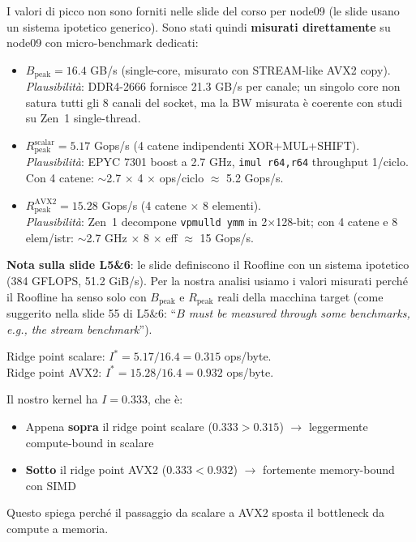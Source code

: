 \documentclass[11pt,a4paper]{article}
\begin{document}
\begin{resultbox}[title=\textbf{Parametri hardware misurati su node09 (micro-benchmark)}]
I valori di picco non sono forniti nelle slide del corso per node09 (le slide usano un sistema ipotetico generico). Sono stati quindi \textbf{misurati direttamente} su node09 con micro-benchmark dedicati:

\begin{itemize}
    \item $B_\text{peak} = 16.4$ GB/s (single-core, misurato con STREAM-like AVX2 copy).\\
    \textit{Plausibilità}: DDR4-2666 fornisce 21.3 GB/s per canale; un singolo core non satura tutti gli 8 canali del socket, ma la BW misurata è coerente con studi su Zen~1 single-thread.
    \item $R_\text{peak}^\text{scalar} = 5.17$ Gops/s (4 catene indipendenti XOR+MUL+SHIFT).\\
    \textit{Plausibilità}: EPYC 7301 boost a 2.7 GHz, \texttt{imul r64,r64} throughput 1/ciclo. Con 4 catene: $\sim$2.7 $\times$ 4 $\times$ ops/ciclo $\approx$ 5.2 Gops/s.
    \item $R_\text{peak}^\text{AVX2} = 15.28$ Gops/s (4 catene $\times$ 8 elementi).\\
    \textit{Plausibilità}: Zen~1 decompone \texttt{vpmulld ymm} in 2$\times$128-bit; con 4 catene e 8 elem/istr: $\sim$2.7 GHz $\times$ 8 $\times$ eff $\approx$ 15 Gops/s.
\end{itemize}

\textbf{Nota sulla slide L5\&6}: le slide definiscono il Roofline con un sistema ipotetico (384 GFLOPS, 51.2 GiB/s). Per la nostra analisi usiamo i valori misurati perché il Roofline ha senso solo con $B_\text{peak}$ e $R_\text{peak}$ reali della macchina target (come suggerito nella slide 55 di L5\&6: ``\textit{$B$ must be measured through some benchmarks, e.g., the stream benchmark}'').

\medskip
Ridge point scalare: $I^* = 5.17 / 16.4 = 0.315$ ops/byte.\\
Ridge point AVX2: $I^* = 15.28 / 16.4 = 0.932$ ops/byte.

Il nostro kernel ha $I = 0.333$, che è:
\begin{itemize}
    \item Appena \textbf{sopra} il ridge point scalare ($0.333 > 0.315$) $\to$ leggermente compute-bound in scalare
    \item \textbf{Sotto} il ridge point AVX2 ($0.333 < 0.932$) $\to$ fortemente memory-bound con SIMD
\end{itemize}
Questo spiega perché il passaggio da scalare a AVX2 sposta il bottleneck da compute a memoria.
\end{resultbox}
\end{document}
